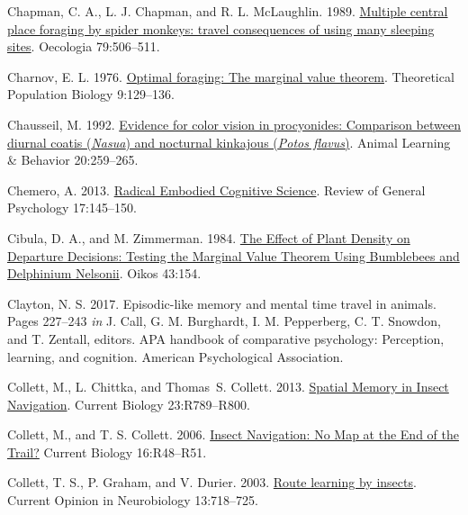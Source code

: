 \documentclass[twoside,12pt,final]{ucthesis-CA2012}
\newenvironment{CSLReferences}%
  {}%
  {\par}
\begin{document}
\begin{ucmainmatter}
\begin{CSLReferences}{1}{0}
\leavevmode{}%
Chapman, C. A., L. J. Chapman, and R. L. McLaughlin. 1989. \href{https://doi.org/10.1007/BF00378668}{Multiple central place foraging by spider monkeys: travel consequences of using many sleeping sites}. Oecologia 79:506--511.

\leavevmode{}%
Charnov, E. L. 1976. \href{https://doi.org/10.1016/0040-5809(76)90040-x}{Optimal foraging: The marginal value theorem}. Theoretical Population Biology 9:129--136.

\leavevmode{}%
Chausseil, M. 1992. \href{https://doi.org/10.3758/BF03213380}{Evidence for color vision in procyonides: Comparison between diurnal coatis (\emph{Nasua}) and nocturnal kinkajous (\emph{Potos flavus})}. Animal Learning \& Behavior 20:259--265.

\leavevmode{}%
Chemero, A. 2013. \href{https://doi.org/10.1093/pq/pqu092}{Radical Embodied Cognitive Science}. Review of General Psychology 17:145--150.

\leavevmode{}%
Cibula, D. A., and M. Zimmerman. 1984. \href{https://doi.org/10.2307/3544763}{The Effect of Plant Density on Departure Decisions: Testing the Marginal Value Theorem Using Bumblebees and Delphinium Nelsonii}. Oikos 43:154.

\leavevmode{}%
Clayton, N. S. 2017. Episodic-like memory and mental time travel in animals. Pages 227--243 \emph{in} J. Call, G. M. Burghardt, I. M. Pepperberg, C. T. Snowdon, and T. Zentall, editors. APA handbook of comparative psychology: Perception, learning, and cognition. American Psychological Association.

\leavevmode{}%
Collett, M., L. Chittka, and Thomas~S. Collett. 2013. \href{https://doi.org/10.1016/j.cub.2013.07.020}{Spatial Memory in Insect Navigation}. Current Biology 23:R789--R800.

\leavevmode{}%
Collett, M., and T. S. Collett. 2006. \href{https://doi.org/10.1016/j.cub.2006.01.007}{Insect Navigation: No Map at the End of the Trail?} Current Biology 16:R48--R51.

\leavevmode{}%
Collett, T. S., P. Graham, and V. Durier. 2003. \href{https://doi.org/10.1016/j.conb.2003.10.004}{Route learning by insects}. Current Opinion in Neurobiology 13:718--725.


\end{CSLReferences}
\end{ucmainmatter}
\end{document}
